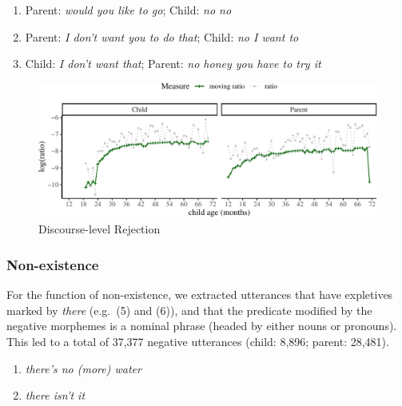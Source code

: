 \documentclass[
  english,
  man,floatsintext]{apa6}
\providecommand{\tightlist}{%
  \setlength{\itemsep}{0pt}\setlength{\parskip}{0pt}}
\begin{document}
\begin{enumerate}
\def\labelenumi{(\arabic{enumi})}
\setcounter{enumi}{4}
\tightlist
\item
  Parent: \emph{would you like to go}; Child: \emph{no no}
\item
  Parent: \emph{I don't want you to do that}; Child: \emph{no I want to}
\item
  Child: \emph{I don't want that}; Parent: \emph{no honey you have to try it}
\end{enumerate}

\begin{figure}[H]

{\centering \includegraphics{neg_construction_article_files/figure-latex/emotiondiscourse-1} 

}

\caption{Discourse-level Rejection}\label{fig:emotiondiscourse}
\end{figure}

\clearpage

\hypertarget{non-existence}{%
\subsubsection{Non-existence}\label{non-existence}}

For the function of non-existence, we extracted utterances that have expletives marked by \emph{there} (e.g.~(5) and (6)), and that the predicate modified by the negative morphemes is a nominal phrase (headed by either nouns or pronouns). This led to a total of 37,377 negative utterances (child: 8,896; parent: 28,481).

\begin{enumerate}
\def\labelenumi{(\arabic{enumi})}
\setcounter{enumi}{4}
\tightlist
\item
  \emph{there's no (more) water}
\item
  \emph{there isn't it}
\end{enumerate}
\end{document}

